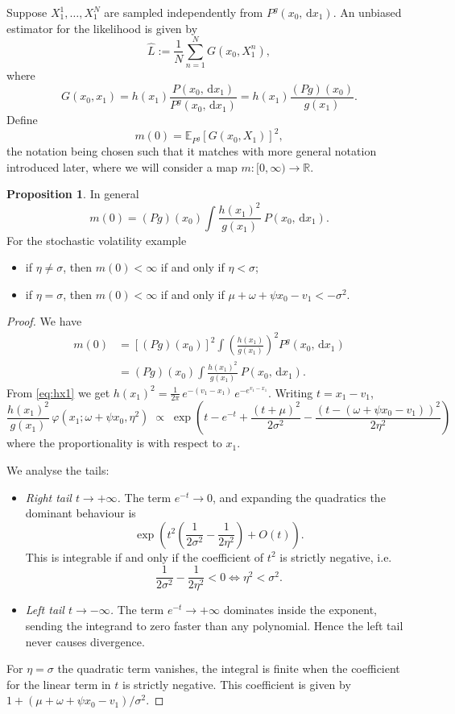\documentclass[11pt,reqno]{amsart}
\newcommand{\dd}{{\,\mathrm d}}
\renewcommand{\phi}{\varphi}
\newcommand{\RR}{\mathbb{R}}
\theoremstyle{definition}
\newtheorem{prop}[thm]{Proposition}
\begin{document}
Suppose $X_1^1,\ldots, X_1^N$ are sampled independently from $P^g(x_0, \dd x_1)$. An unbiased estimator for the likelihood is given by
\[ \hat{L} := \frac1{N}\sum_{n=1}^N G(x_0, X_1^n), \] 
where 
\[ G(x_0, x_1) = h(x_1)\frac{P(x_0, \dd x_1)}{P^g(x_0, \dd x_1)} = h(x_1) \frac{(Pg)(x_0)}{g(x_1)}.\]
Define
\begin{equation}
	\label{eq:m0}  m(0) = \mathbb{E}_{P^{g}}\!\left[G(x_0, X_1)\right]^2 ,
\end{equation}
the notation being chosen such that it matches with more general notation introduced later, where we will consider a map $m \colon [0,\infty) \to \RR$. 
\begin{prop} In general
\[ 	m(0) = (Pg)(x_0) \int \frac{h(x_1)^2}{g(x_1)}\ P(x_0, \dd x_1). \] For the stochastic volatility example
\begin{itemize}
	\item if $\eta\neq \sigma$, then $m(0)<\infty$ if and only if  $\eta < \sigma$;
	\item if $\eta=\sigma$, then $m(0)<\infty$ if and only if $\mu +\omega+\psi x_0-v_1 <-\sigma^2$.  
\end{itemize}
\end{prop}
\begin{proof} 
We have
\begin{align*}
	m(0) & = [(Pg)(x_0)]^2 \int \left(\frac{h(x_1)}{g(x_1)}\right)^2 P^g(x_0, \dd x_1) \\&= (Pg)(x_0) \int \frac{h(x_1)^2}{g(x_1)}\ P(x_0, \dd x_1).
\end{align*}
From \eqref{eq:hx1} we get 	$h(x_1)^2 = \frac{1}{2\pi}\,e^{-(v_1-x_1)}\,e^{-e^{v_1-x_1}}$.
Writing $t = x_1 - v_1$, 
\[
  \frac{h(x_1)^2}{g(x_1)}\,\phi(x_1; \omega+\psi x_0, \eta^2)
  \;\propto\;
  \exp\!\left(t - e^{-t} + \frac{(t+\mu)^2}{2\sigma^2}
  - \frac{(t - (\omega+\psi x_0 - v_1))^2}{2\eta^2}\right)
\]
where the proportionality is with respect to $x_1$. 

We analyse the tails:
\begin{itemize}
	\item {\it Right tail $t\to+\infty$.}
The term $e^{-t}\to 0$, and expanding the quadratics the dominant behaviour is
\[
  \exp\!\left(t^2\!\left(\frac{1}{2\sigma^2} - \frac{1}{2\eta^2}\right) + O(t)\right).
\]
This is integrable if and only if the coefficient of $t^2$ is strictly negative, i.e.
\[
  \frac{1}{2\sigma^2} - \frac{1}{2\eta^2} < 0 \iff \eta^2 < \sigma^2.
\]

\item {\it Left tail $t\to-\infty$.}
The term $e^{-t}\to+\infty$ dominates inside the exponent, sending the integrand
to zero faster than any polynomial. Hence the left tail never causes divergence.
\end{itemize}
For $\eta=\sigma$ the quadratic term vanishes, the integral is finite when the coefficient for the linear term in $t$ is strictly negative. This coefficient is given by $1+(\mu+\omega +\psi x_0 -v_1)/\sigma^2$. 
\end{proof}
\end{document}
